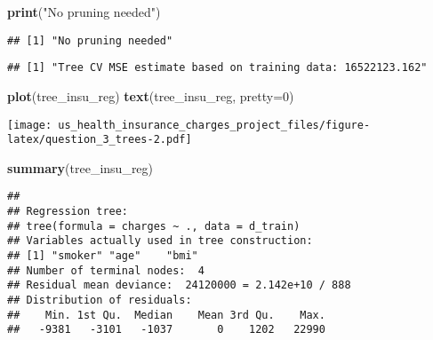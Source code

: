 \documentclass[
]{article}
\newenvironment{Shaded}{\begin{snugshade}}{\end{snugshade}}
\newcommand{\AttributeTok}[1]{\textcolor[rgb]{0.13,0.29,0.53}{#1}}
\newcommand{\CommentTok}[1]{\textcolor[rgb]{0.56,0.35,0.01}{\textit{#1}}}
\newcommand{\DecValTok}[1]{\textcolor[rgb]{0.00,0.00,0.81}{#1}}
\newcommand{\FunctionTok}[1]{\textcolor[rgb]{0.13,0.29,0.53}{\textbf{#1}}}
\newcommand{\NormalTok}[1]{#1}
\newcommand{\OtherTok}[1]{\textcolor[rgb]{0.56,0.35,0.01}{#1}}
\newcommand{\SpecialCharTok}[1]{\textcolor[rgb]{0.81,0.36,0.00}{\textbf{#1}}}
\newcommand{\StringTok}[1]{\textcolor[rgb]{0.31,0.60,0.02}{#1}}
\begin{document}
\begin{Shaded}
\begin{Highlighting}[]
\FunctionTok{print}\NormalTok{(}\StringTok{"No pruning needed"}\NormalTok{)}
\end{Highlighting}
\end{Shaded}

\begin{verbatim}
## [1] "No pruning needed"
\end{verbatim}

\begin{Shaded}
\end{Shaded}

\begin{verbatim}
## [1] "Tree CV MSE estimate based on training data: 16522123.162"
\end{verbatim}

\begin{Shaded}
\begin{Highlighting}[]
\FunctionTok{plot}\NormalTok{(tree\_insu\_reg)}
\FunctionTok{text}\NormalTok{(tree\_insu\_reg, }\AttributeTok{pretty=}\DecValTok{0}\NormalTok{)}
\end{Highlighting}
\end{Shaded}

\texttt{[image: us\_health\_insurance\_charges\_project\_files/figure-latex/question\_3\_trees-2.pdf]}

\begin{Shaded}
\begin{Highlighting}[]
\FunctionTok{summary}\NormalTok{(tree\_insu\_reg)}
\end{Highlighting}
\end{Shaded}

\begin{verbatim}
## 
## Regression tree:
## tree(formula = charges ~ ., data = d_train)
## Variables actually used in tree construction:
## [1] "smoker" "age"    "bmi"   
## Number of terminal nodes:  4 
## Residual mean deviance:  24120000 = 2.142e+10 / 888 
## Distribution of residuals:
##    Min. 1st Qu.  Median    Mean 3rd Qu.    Max. 
##   -9381   -3101   -1037       0    1202   22990
\end{verbatim}
\end{document}
